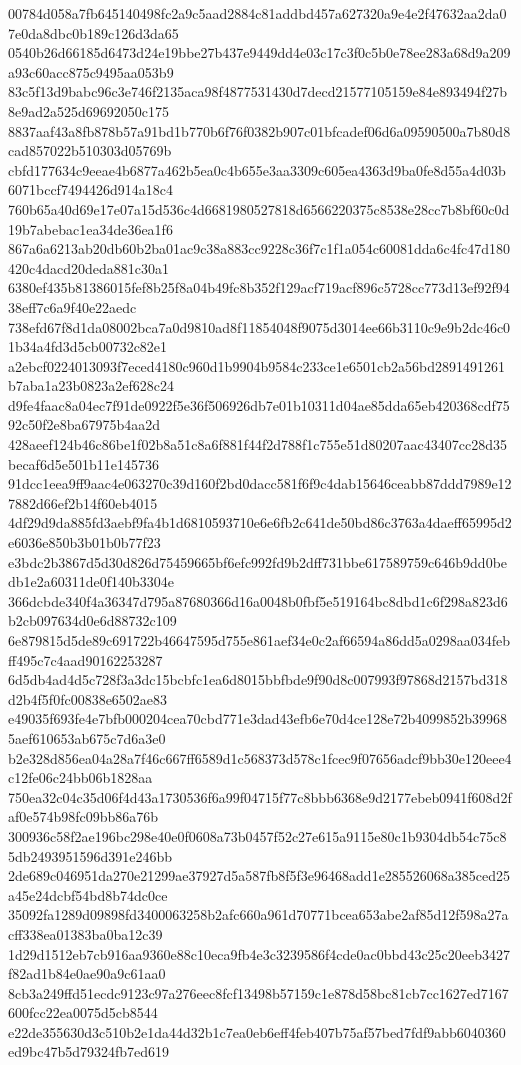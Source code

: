 {00784d058a7fb645140498fc2a9c5aad2884c81addbd457a627320a9e4e2f47632aa2da07e0da8dbc0b189c126d3da65
0540b26d66185d6473d24e19bbe27b437e9449dd4e03c17c3f0c5b0e78ee283a68d9a209a93c60acc875c9495aa053b9
83c5f13d9babc96c3e746f2135aca98f4877531430d7decd21577105159e84e893494f27b8e9ad2a525d69692050c175
8837aaf43a8fb878b57a91bd1b770b6f76f0382b907c01bfcadef06d6a09590500a7b80d8cad857022b510303d05769b
cbfd177634c9eeae4b6877a462b5ea0c4b655e3aa3309c605ea4363d9ba0fe8d55a4d03b6071bccf7494426d914a18c4
760b65a40d69e17e07a15d536c4d6681980527818d6566220375c8538e28cc7b8bf60c0d19b7abebac1ea34de36ea1f6
867a6a6213ab20db60b2ba01ac9c38a883cc9228c36f7c1f1a054c60081dda6c4fc47d180420c4dacd20deda881c30a1
6380ef435b81386015fef8b25f8a04b49fc8b352f129acf719acf896c5728cc773d13ef92f9438eff7c6a9f40e22aedc
738efd67f8d1da08002bca7a0d9810ad8f11854048f9075d3014ee66b3110c9e9b2dc46c01b34a4fd3d5cb00732c82e1
a2ebcf0224013093f7eced4180c960d1b9904b9584c233ce1e6501cb2a56bd2891491261b7aba1a23b0823a2ef628c24
d9fe4faac8a04ec7f91de0922f5e36f506926db7e01b10311d04ae85dda65eb420368cdf7592c50f2e8ba67975b4aa2d
428aeef124b46c86be1f02b8a51c8a6f881f44f2d788f1c755e51d80207aac43407cc28d35becaf6d5e501b11e145736
91dcc1eea9ff9aac4e063270c39d160f2bd0dacc581f6f9c4dab15646ceabb87ddd7989e127882d66ef2b14f60eb4015
4df29d9da885fd3aebf9fa4b1d6810593710e6e6fb2c641de50bd86c3763a4daeff65995d2e6036e850b3b01b0b77f23
e3bdc2b3867d5d30d826d75459665bf6efc992fd9b2dff731bbe617589759c646b9dd0bedb1e2a60311de0f140b3304e
366dcbde340f4a36347d795a87680366d16a0048b0fbf5e519164bc8dbd1c6f298a823d6b2cb097634d0e6d88732c109
6e879815d5de89c691722b46647595d755e861aef34e0c2af66594a86dd5a0298aa034febff495c7c4aad90162253287
6d5db4ad4d5c728f3a3dc15bcbfc1ea6d8015bbfbde9f90d8c007993f97868d2157bd318d2b4f5f0fc00838e6502ae83
e49035f693fe4e7bfb000204cea70cbd771e3dad43efb6e70d4ce128e72b4099852b399685aef610653ab675c7d6a3e0
b2e328d856ea04a28a7f46c667ff6589d1c568373d578c1fcec9f07656adcf9bb30e120eee4c12fe06c24bb06b1828aa
750ea32c04c35d06f4d43a1730536f6a99f04715f77c8bbb6368e9d2177ebeb0941f608d2faf0e574b98fc09bb86a76b
300936c58f2ae196bc298e40e0f0608a73b0457f52c27e615a9115e80c1b9304db54c75c85db2493951596d391e246bb
2de689c046951da270e21299ae37927d5a587fb8f5f3e96468add1e285526068a385ced25a45e24dcbf54bd8b74dc0ce
35092fa1289d09898fd3400063258b2afc660a961d70771bcea653abe2af85d12f598a27acff338ea01383ba0ba12c39
1d29d1512eb7cb916aa9360e88c10eca9fb4e3c3239586f4cde0ac0bbd43c25c20eeb3427f82ad1b84e0ae90a9c61aa0
8cb3a249ffd51ecdc9123c97a276eec8fcf13498b57159c1e878d58bc81cb7cc1627ed7167600fcc22ea0075d5cb8544
e22de355630d3c510b2e1da44d32b1c7ea0eb6eff4feb407b75af57bed7fdf9abb6040360ed9bc47b5d79324fb7ed619
}
